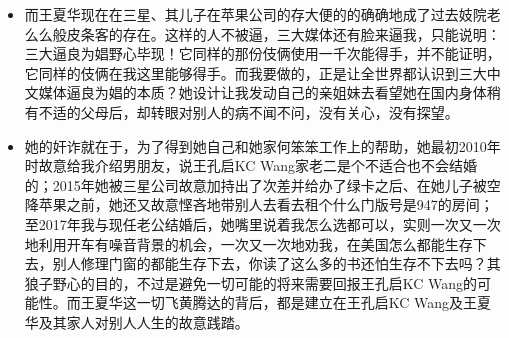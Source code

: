 \documentclass[9pt, b5paper]{article}
\begin{document}
\begin{itemize}
\item 而王夏华现在在三星、其儿子在苹果公司的存大便的的确确地成了过去妓院老么么般皮条客的存在。这样的人不被逼，三大媒体还有脸来逼我，只能说明：三大逼良为娼野心毕现！它同样的那份伎俩使用一千次能得手，并不能证明，它同样的伎俩在我这里能够得手。而我要做的，正是让全世界都认识到三大中文媒体逼良为娼的本质？她设计让我发动自己的亲姐妹去看望她在国内身体稍有不适的父母后，却转眼对别人的病不闻不问，没有关心，没有探望。
\item 她的奸诈就在于，为了得到她自己和她家何笨笨工作上的帮助，她最初2010年时故意给我介绍男朋友，说王孔启KC Wang家老二是个不适合也不会结婚的；2015年她被三星公司故意加持出了次差并给办了绿卡之后、在她儿子被空降苹果之前，她还又故意悭吝地带别人去看去租个什么门版号是947的房间；至2017年我与现任老公结婚后，她嘴里说着我怎么选都可以，实则一次又一次地利用开车有噪音背景的机会，一次又一次地劝我，在美国怎么都能生存下去，别人修理门窗的都能生存下去，你读了这么多的书还怕生存不下去吗？其狼子野心的目的，不过是避免一切可能的将来需要回报王孔启KC Wang的可能性。而王夏华这一切飞黄腾达的背后，都是建立在王孔启KC Wang及王夏华及其家人对别人人生的故意践踏。
\end{itemize}
\end{document}
